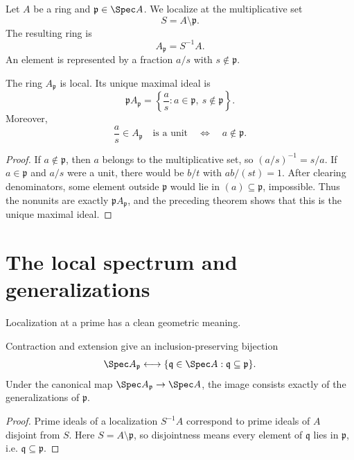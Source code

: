 Let $A$ be a ring and $\mathfrak p\in\Spec A$.  We localize at the multiplicative set
\[
S=A\setminus\mathfrak p.
\]
The resulting ring is
\[
A_{\mathfrak p}=S^{-1}A.
\]
An element is represented by a fraction $a/s$ with $s\notin\mathfrak p$.

\begin{theorem}
The ring $A_{\mathfrak p}$ is local.  Its unique maximal ideal is
\[
\mathfrak pA_{\mathfrak p}
=
\left\{\frac{a}{s}:a\in\mathfrak p,\ s\notin\mathfrak p\right\}.
\]
Moreover,
\[
\frac{a}{s}\in A_{\mathfrak p}
\quad\text{is a unit}\quad
\Longleftrightarrow\quad
a\notin\mathfrak p.
\]
\end{theorem}

\begin{proof}
If $a\notin\mathfrak p$, then $a$ belongs to the multiplicative set, so
$(a/s)^{-1}=s/a$.  If $a\in\mathfrak p$ and $a/s$ were a unit, there would be $b/t$ with
$ab/(st)=1$.  After clearing denominators, some element outside $\mathfrak p$ would lie in
$(a)\subseteq\mathfrak p$, impossible.  Thus the nonunits are exactly
$\mathfrak pA_{\mathfrak p}$, and the preceding theorem shows that this is the unique
maximal ideal.
\end{proof}



\section{The local spectrum and generalizations}

Localization at a prime has a clean geometric meaning.

\begin{theorem}
Contraction and extension give an inclusion-preserving bijection
\[
\Spec A_{\mathfrak p}
\longleftrightarrow
\{\mathfrak q\in\Spec A:\mathfrak q\subseteq\mathfrak p\}.
\]
Under the canonical map $\Spec A_{\mathfrak p}\to\Spec A$, the image consists exactly of
the generalizations of $\mathfrak p$.
\end{theorem}

\begin{proof}
Prime ideals of a localization $S^{-1}A$ correspond to prime ideals of $A$ disjoint from
$S$.  Here $S=A\setminus\mathfrak p$, so disjointness means every element of
$\mathfrak q$ lies in $\mathfrak p$, i.e. $\mathfrak q\subseteq\mathfrak p$.
\end{proof}

